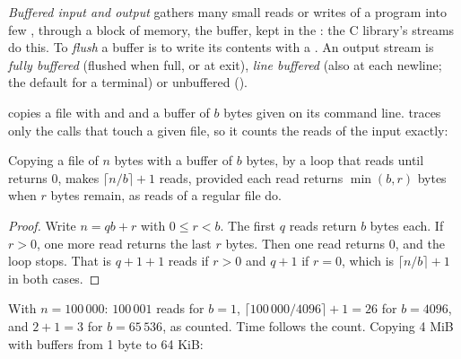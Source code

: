 \begin{definition}\label{def:b2:files-pipes-signals:buffering}
\emph{Buffered input and output} gathers many small reads or writes of a program into
few , through a block of memory, the buffer, kept in the : the C library's  streams do
this. To \emph{flush} a buffer is to write its contents with a . An output stream is
\emph{fully buffered} (flushed when full, or at exit), \emph{line buffered} (also at each newline; the default for a
terminal) or unbuffered ().
\end{definition}

 copies a file with  and  and a buffer of $b$ bytes given on its command line.
 traces only the calls that touch a given file, so it counts the reads of the input exactly:



\label{out:b2:files-pipes-signals:counts}

\begin{proposition}\label{prop:b2:files-pipes-signals:calls}
Copying a file of $n$ bytes with a buffer of $b$ bytes, by a loop that reads until  returns 0, makes
$\lceil n / b \rceil + 1$ reads, provided each read returns $\min(b, r)$ bytes when $r$ bytes remain, as reads of a
regular file do.
\end{proposition}

\begin{proof}
Write $n = qb + r$ with $0 \le r < b$. The first $q$ reads return $b$ bytes each. If $r > 0$, one more read returns
the last $r$ bytes. Then one read returns 0, and the loop stops. That is $q + 1 + 1$ reads if $r > 0$ and $q + 1$ if
$r = 0$, which is $\lceil n/b \rceil + 1$ in both cases.
\end{proof}

With $n = 100\,000$: $100\,001$ reads for $b = 1$, $\lceil 100\,000 / 4096 \rceil + 1 = 26$ for $b = 4096$, and
$2 + 1 = 3$ for $b = 65\,536$, as counted. Time follows the count. Copying 4 MiB with buffers from 1 byte to 64 KiB:

